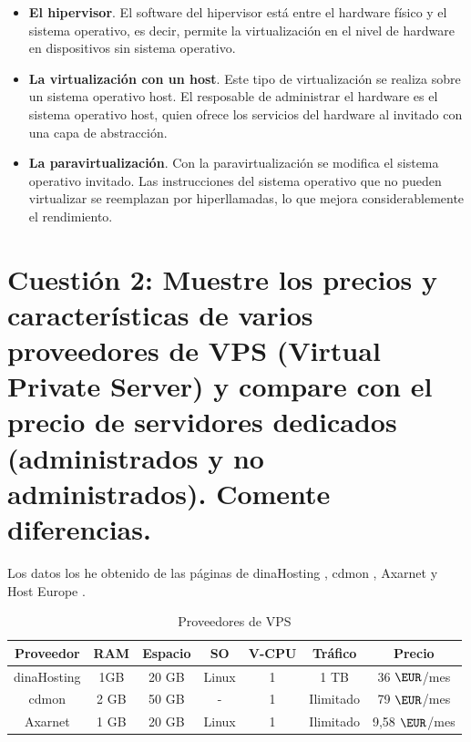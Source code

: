\begin{itemize}
	\item \textbf{El hipervisor}. El software del hipervisor está entre el hardware físico y el sistema operativo, es decir, permite la virtualización en el nivel de hardware en dispositivos sin sistema operativo.
	\item \textbf{La virtualización con un host}. Este tipo de virtualización se realiza sobre un sistema operativo host. El resposable de administrar el hardware es el sistema operativo host, quien ofrece los servicios del hardware al invitado con una capa de abstracción.
	\item \textbf{La paravirtualización}. Con la paravirtualización se modifica el sistema operativo invitado. Las instrucciones del sistema operativo que no pueden virtualizar se reemplazan por hiperllamadas, lo que mejora considerablemente el rendimiento.
\end{itemize}




\section{Cuestión 2: Muestre los precios y características de varios proveedores de VPS (Virtual Private Server) y compare con el precio de servidores dedicados (administrados y no administrados). Comente diferencias.}

Los datos los he obtenido de las páginas de dinaHosting \cite{dinahosting}, cdmon \cite{cdmon}, Axarnet \cite{axarnet} y Host Europe \cite{hosteurope}.

\begin{table}[H]
\centering
\begin{tabular}{|c|c|c|c|c|c|c|}
\hline
\textbf{Proveedor} & \textbf{RAM} & \textbf{Espacio} & \textbf{SO} & \textbf{V-CPU} & \textbf{Tráfico} & \textbf{Precio} \\ \hline
dinaHosting        & 1GB          & 20 GB            & Linux       & 1              & 1 TB             & 36 $\EUR$/mes        \\ \hline
cdmon              & 2 GB         & 50 GB            & -           & 1              & Ilimitado        & 79 $\EUR$/mes        \\ \hline
Axarnet            & 1 GB         & 20 GB            & Linux       & 1              & Ilimitado        & 9,58 $\EUR$/mes    \\ \hline 
\end{tabular}
\caption{Proveedores de VPS} \label{tab:proVPS}
\end{table}

